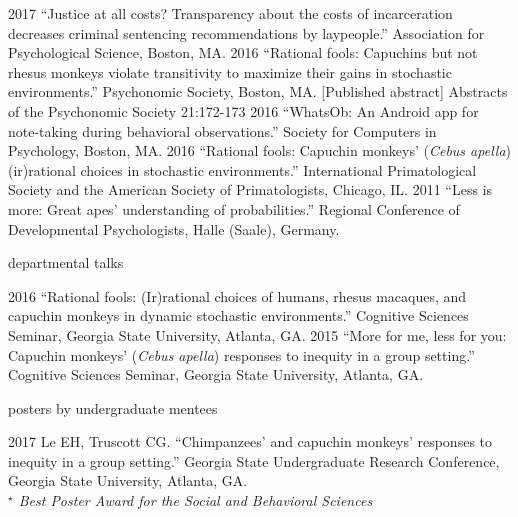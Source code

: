 \documentclass[]{friggeri-cv}
\begin{document}
\begin{entrylist2}
  \entrytwo
    {2017}
    {``Justice at all costs? Transparency about the costs of incarceration decreases criminal sentencing recommendations by laypeople.'' Association for Psychological Science, Boston, MA.}
  \entrytwo
    {2016}
    {``Rational fools: Capuchins but not rhesus monkeys violate transitivity to maximize their gains in stochastic environments.'' Psychonomic Society, Boston, MA. [Published abstract] Abstracts of the Psychonomic Society 21:172-173}
  \entrytwo
    {2016}
    {``WhatsOb: An Android app for note-taking during behavioral observations.'' Society for Computers in Psychology, Boston, MA.}
  \entrytwo
    {2016}
    {``Rational fools: Capuchin monkeys' (\emph{Cebus apella}) (ir)rational choices in stochastic environments.'' International Primatological Society and the American Society of Primatologists, Chicago, IL.}
  \entrytwo
    {2011}
    {``Less is more: Great apes' understanding of probabilities.'' Regional Conference of Developmental Psychologists, Halle (Saale), Germany.}
\end{entrylist2}


{\subfont\large{} departmental talks}

\begin{entrylist2}
  \entrytwo
    {2016}
    {``Rational fools: (Ir)rational choices of humans, rhesus macaques, and capuchin monkeys in dynamic stochastic environments.'' Cognitive Sciences Seminar, Georgia State University, Atlanta, GA.}
  \entrytwo
    {2015}
    {``More for me, less for you: Capuchin monkeys' (\emph{Cebus apella}) responses to inequity in a group setting.'' Cognitive Sciences Seminar, Georgia State University, Atlanta, GA.}
\end{entrylist2}


{\subfont\large{} posters by undergraduate mentees}

\begin{entrylist2}
  \entrytwo
    {2017}
    {Le EH, Truscott CG. ``Chimpanzees' and capuchin monkeys' responses to inequity in a group setting.'' Georgia State Undergraduate Research Conference, Georgia State University, Atlanta, GA.\\
    \emph{${}^\star$ Best Poster Award for the Social and Behavioral Sciences}}
\end{entrylist2}
\end{document}
